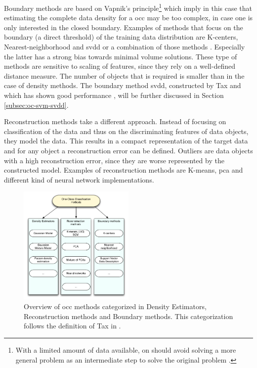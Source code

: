 Boundary methods are based on Vapnik's principle\footnote{With a limited amount of data available, on should avoid solving a more general problem as an intermediate step to solve the original problem \cite{vapnik1998statistical}.} which imply in this case that estimating the complete data density for a \gls{occ} may be too complex, in case one is only interested in the closed boundary.
Examples of methods that focus on the boundary (a direct threshold) of the training data distribution are K-centers, Nearest-neighborhood and \gls{svdd} or a combination of those methods \cite{hempstalk2008one}.
Especially the latter has a strong bias towards minimal volume solutions.
These type of methods are sensitive to scaling of features, since they rely on a well-defined distance measure.
The number of objects that is required is smaller than in the case of density methods.
The boundary method \gls{svdd}, constructed by Tax and which has shown good performance \cite{khan2010survey}, will be further discussed in Section \ref{subsec:oc-svm-svdd}.

Reconstruction methods take a different approach.
Instead of focusing on classification of the data and thus on the discriminating features of data objects, they model the data.
This results in a compact representation of the target data and for any object a reconstruction error can be defined.
Outliers are data objects with a high reconstruction error, since they are worse represented by the constructed model.
Examples of reconstruction methods are K-means, \gls{pca} and different kind of neural network implementations.

\begin{figure}
  \centering
    \includegraphics[width=0.5\textwidth,keepaspectratio]{./Figures/chapter3/occ_methods.pdf}
  \caption[\gls{occ} methods]{Overview of \gls{occ} methods categorized in Density Estimators, Reconstruction methods and Boundary methods. This categorization follows the definition of Tax in \cite{tax2001one}.}
  \label{fig:occ-methods}
\end{figure}

